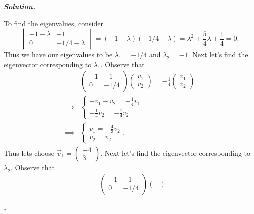 \documentclass[12pt]{report}
\newenvironment{solution}[1][\it{Solution}]{\textbf{#1. } }{$\square$}
\begin{document}
\begin{solution}
\begin{enumerate}
        \noindent
        To find the eigenvalues, consider
        \[
            \begin{vmatrix}
                -1 - \lambda & -1\\
                0 & -1/4 - \lambda
            \end{vmatrix} = (-1 - \lambda)(-1/4 - \lambda) = \lambda^2 + \frac{5}{4}\lambda + \frac{1}{4} = 0.
        \]
        Thus we have our eigenvalues to be $\lambda_1 = - 1/4$ and $\lambda_2 = -1$. Next let's find the eigenvector corresponding to $\lambda_1$. Observe that
        \begin{align*}
            &\begin{pmatrix}
                -1 & -1\\
                0 & -1/4
            \end{pmatrix}\begin{pmatrix}
                v_1\\
                v_2
            \end{pmatrix} = -\frac{1}{4} \begin{pmatrix}
                v_1\\
                v_2
            \end{pmatrix}\\
            \implies & \begin{cases}
                -v_1 - v_2 = - \frac{1}{4}v_1\\
                -\frac{1}{4}v_2 = -\frac{1}{4}v_2
            \end{cases}\\
            \implies &\begin{cases}
                v_1 = - \frac{4}{3}v_2\\
                v_2 = v_2
            \end{cases}.
        \end{align*}
        Thus lets choose $\vec{v}_1 = \begin{pmatrix}
            -4\\
            3
        \end{pmatrix}$.
        Next let's find the eigenvector corresponding to $\lambda_2$. Observe that
        \begin{align*}
            &\begin{pmatrix}
                -1 & -1\\
                0 & -1/4
            \end{pmatrix}\begin{pmatrix}

\end{pmatrix}
\end{align*}
\end{enumerate}
\end{solution}
\end{document}
